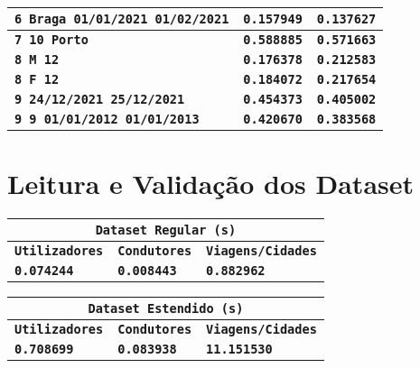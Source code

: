 \documentclass[12pt,a4paper]{report}
\begin{document}
{\begin{tabularx}{\textwidth} { 
  | >{\centering\arraybackslash}X
  | >{\centering\arraybackslash}X
  | >{\centering\arraybackslash}X | }
 \hline
 \texttt{\textbf{6 Braga 01/01/2021 01/02/2021}} & \vspace{-5pt}\texttt{\textbf{0.157949}} & \vspace{-5pt}\texttt{\textbf{0.137627}} \\
 \hline
 \texttt{\textbf{7 10 Porto}} & \texttt{\textbf{0.588885}} & \texttt{\textbf{0.571663}} \\
 \hline
 \texttt{\textbf{8 M 12}} & \texttt{\textbf{0.176378}} & \texttt{\textbf{0.212583}} \\
 \hline
 \texttt{\textbf{8 F 12}} & \texttt{\textbf{0.184072}} & \texttt{\textbf{0.217654}} \\
 \hline
 \texttt{\textbf{9 24/12/2021 25/12/2021}} & \vspace{-5pt}\texttt{\textbf{0.454373}} & \vspace{-5pt}\texttt{\textbf{0.405002}} \\
 \hline
 \texttt{\textbf{9 9 01/01/2012 01/01/2013}} & \vspace{-5pt}\texttt{\textbf{0.420670}} & \vspace{-5pt}\texttt{\textbf{0.383568}} \\
 \hline
 \end{tabularx}
}


\section{Leitura e Validação dos Dataset}

{
\setlength\arrayrulewidth{1pt}

\begin{center}
    \begin{tabular}{ |p{4.73cm}|p{4.73cm}|p{4.73cm}|  }
        \hline
        \multicolumn{3}{|c|}{\textbf{\texttt{Dataset Regular (s)}}} \\
        \hline
        \centering\textbf{\texttt{Utilizadores}} & \hfil \textbf{\texttt{Condutores}} & \hfil \textbf{\texttt{Viagens/Cidades}} \\
        \hline
        \centering\textbf{\texttt{0.074244}} & \hfil \texttt{\textbf{0.008443}} & \hfil \texttt{\textbf{0.882962}}\\
        \hline
    \end{tabular}
\end{center}


\begin{center}
    \begin{tabular}{ |p{4.73cm}|p{4.73cm}|p{4.73cm}|  }
        \hline
        \multicolumn{3}{|c|}{\textbf{\texttt{Dataset Estendido (s)}}} \\
        \hline
        \centering\textbf{\texttt{Utilizadores}} & \hfil \textbf{\texttt{Condutores}} & \hfil \textbf{\texttt{Viagens/Cidades}} \\
        \hline
        \centering\textbf{\texttt{0.708699}} & \hfil \texttt{\textbf{0.083938}} & \hfil \texttt{\textbf{11.151530}}\\
        \hline
    \end{tabular}
\end{center}
}
\end{document}
